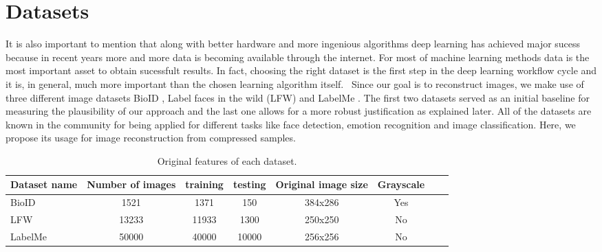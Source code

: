 \section{Datasets}
It is also important to mention that along with better hardware and more ingenious algorithms deep learning has achieved major sucess because in recent years more and more data is becoming available through the internet. For most of machine learning methods data is the most important asset to obtain sucessfult results. In fact, choosing the right dataset is the first step in the deep learning workflow cycle and it is, in general, much more important than the chosen learning algorithm itself. \
Since our goal is to reconstruct images, we make use of three different image datasets BioID \cite{frischholz2003bioid}, Label faces in the wild (LFW) \cite{LFWTech} and LabelMe \cite{russell2008labelme}. The first two datasets served as an initial baseline for measuring the plausibility of our approach and the last one allows for a more robust justification as explained later. All of the datasets are known in the community for being applied for different tasks like face detection, emotion recognition and image classification. Here, we propose its usage for image reconstruction from compressed samples. 
\begin{table}[tb]
\caption[Datasets for training and testing]{Original features of each dataset.}
\label{tab:datasets1}
\centering
\begin{tabular}{l*{6}{c}r}
Dataset name              & Number of images & training & testing &  Original image size& Grayscale \\
\hline
BioID   & 1521 & 1371 & 150 & 384x286 & Yes\\
LFW     & 13233 & 11933 & 1300 & 250x250 & No\\
LabelMe & 50000 & 40000 & 10000 & 256x256 & No\\
\bottomrule 
\end{tabular}  
\end{table}

